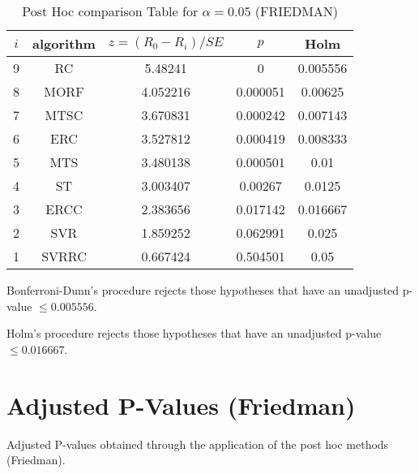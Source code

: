 \documentclass[a4paper,10pt]{article}
\begin{document}
\begin{landscape}
\begin{table}[!htp]
\centering\footnotesize
\begin{tabular}{ccccc}
$i$&algorithm&$z=(R_0 - R_i)/SE$&$p$&Holm \\
\hline9&RC&5.48241&0&0.005556\\8&MORF&4.052216&0.000051&0.00625\\7&MTSC&3.670831&0.000242&0.007143\\6&ERC&3.527812&0.000419&0.008333\\5&MTS&3.480138&0.000501&0.01\\4&ST&3.003407&0.00267&0.0125\\3&ERCC&2.383656&0.017142&0.016667\\2&SVR&1.859252&0.062991&0.025\\1&SVRRC&0.667424&0.504501&0.05\\\hline
\end{tabular}
\caption{Post Hoc comparison Table for $\alpha=0.05$ (FRIEDMAN)}
\end{table}Bonferroni-Dunn's procedure rejects those hypotheses that have an unadjusted p-value $\le0.005556$.

Holm's procedure rejects those hypotheses that have an unadjusted p-value $\le0.016667$.


\newpage

\section{Adjusted P-Values (Friedman)}


Adjusted P-values obtained through the application of the post hoc methods (Friedman).


\end{landscape}
\end{document}
